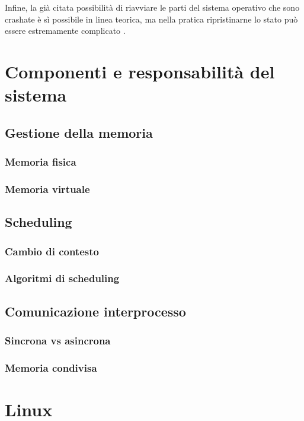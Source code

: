 \documentclass[12pt,a4paper]{report}
\begin{document}
				Infine, la già citata possibilità di riavviare le parti del sistema operativo che sono crashate è sì possibile in linea
				teorica, ma nella pratica ripristinarne lo stato può essere estremamente complicato \cite{OSDEV_Microkernel}.
	
	\section{Componenti e responsabilità del sistema}
		\subsection{Gestione della memoria}
			\subsubsection{Memoria fisica}
			\subsubsection{Memoria virtuale}
		
		\subsection{Scheduling}
			\subsubsection{Cambio di contesto}
			\subsubsection{Algoritmi di scheduling}
			
		\subsection{Comunicazione interprocesso}
			\subsubsection{Sincrona vs asincrona}
			\subsubsection{Memoria condivisa}
	
	\section{Linux}
	
\end{document}
